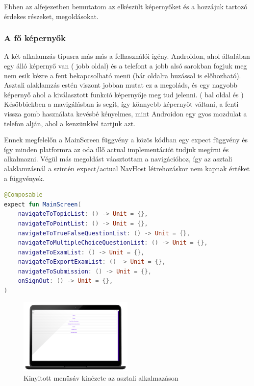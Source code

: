 Ebben az alfejezetben bemutatom az elkészült képernyőket és a hozzájuk tartozó érdekes részeket, megoldásokat.

\subsubsection{A fő képernyők}

A két alkalamzás típusra más-más a felhasználói igény.
Androidon, ahol általában egy álló képernyő van ( jobb oldal) és a telefont a jobb alsó sarokban fogjuk meg nem esik kézre a fent bekapcsolható menü (bár oldalra huzással is előhozható). 
Asztali alaklamzás estén viszont jobban mutat ez a megoláds, és egy nagyobb képernyő ahol a kiválasztott funkció képernyője meg tud jelenni. ( bal oldal és )
Későbbiekben a mavigálásban is segít, így könnyebb képernyőt váltani, a fenti vissza gomb használata kevésbé kényelmes, mint Androidon egy gyos mozdulat a telefon alján, ahol a kenzünkkel tartjuk azt.

Ennek megfelelőn a MainScreen függvény a közös kódban egy expect függvény és így minden platformra az oda illő actual implementációt tudjuk megírni és alkalmazni.
Végül más megoldást váasztottam a navigációhoz, így az asztali alaklamzásnál a szintén expect/actual NavHost létrehozáskor nem kapnak értéket a függvények.
\begin{lstlisting}[caption={Expect Főképernyő.}, label={lst:ExpectMainScreen}, language=Kotlin]
@Composable
expect fun MainScreen(
    navigateToTopicList: () -> Unit = {},
    navigateToPointList: () -> Unit = {},
    navigateToTrueFalseQuestionList: () -> Unit = {},
    navigateToMultipleChoiceQuestionList: () -> Unit = {},
    navigateToExamList: () -> Unit = {},
    navigateToExportExamList: () -> Unit = {},
    navigateToSubmission: () -> Unit = {},
    onSignOut: () -> Unit = {},
)
\end{lstlisting}
\begin{figure}[!ht]
    \centering
    \includegraphics[width=0.5\textwidth, keepaspectratio]{figures/MainScreen_Desktop2_framed.png}
    \caption{Kinyitott menüsáv kinézete az asztali alkalmazáson}
    \label{fig:OpenMenu}
\end{figure}

